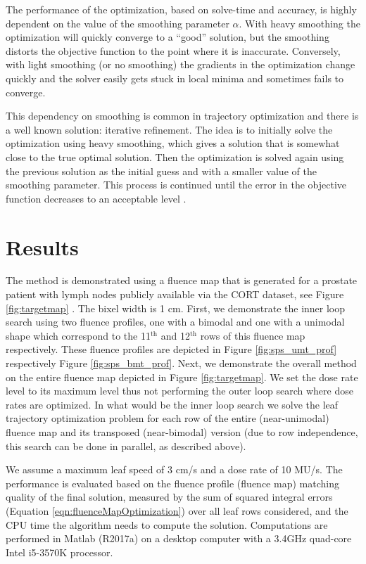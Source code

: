\documentclass{iopart}
\newcommand{\quotes}[1]{``#1''}   %
\begin{document}
The performance of the optimization, based on solve-time and accuracy, is highly dependent on the value of the smoothing parameter $\alpha$. With heavy smoothing the optimization will quickly converge to a \quotes{good} solution, but the smoothing distorts the objective function to the point where it is inaccurate. Conversely, with light smoothing (or no smoothing) the gradients in the optimization change quickly and the solver easily gets stuck in local minima and sometimes fails to converge.

This dependency on smoothing is common in trajectory optimization and there is a well known solution: iterative refinement. The idea is to initially solve the optimization using heavy smoothing, which gives a solution that is somewhat close to the true optimal solution. Then the optimization is solved again using the previous solution as the initial guess and with a smaller value of the smoothing parameter. This process is continued until the error in the objective function decreases to an acceptable level \cite{Srinivasan2006}.

\section{Results}
The method is demonstrated using a fluence map that is generated for a prostate patient with lymph nodes publicly available via the CORT dataset, see Figure \ref{fig:targetmap} \cite{CORT14}.
The bixel width is 1 cm.
First, we demonstrate the inner loop search using two fluence profiles, one with a bimodal and one with a unimodal shape which correspond to the 11$^\text{th}$ and 12$^\text{th}$ rows of this fluence map respectively.
These fluence profiles are depicted in Figure \ref{fig:sps_umt_prof} respectively Figure \ref{fig:sps_bmt_prof}.
Next, we demonstrate the overall method on the entire fluence map depicted in Figure \ref{fig:targetmap}.
We set the dose rate level to its maximum level thus not performing the outer loop search where dose rates are optimized. In what would be the inner loop search we solve the leaf trajectory optimization problem for each row of the entire (near-unimodal) fluence map and its transposed (near-bimodal) version (due to row independence, this search can be done in parallel, as described above). 

We assume a maximum leaf speed of 3 cm/s and a dose rate of 10 MU/s. 
The performance is evaluated based on the fluence profile (fluence map) matching quality of the final solution, measured by the sum of squared integral errors (Equation \ref{eqn:fluenceMapOptimization}) over all leaf rows considered, and the CPU time the algorithm needs to compute the solution.
Computations are performed in Matlab (R2017a) on a desktop computer with a 3.4GHz quad-core Intel i5-3570K processor.
\end{document}
